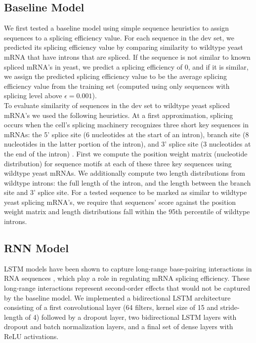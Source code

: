 \documentclass{article}
\begin{document}
\subsection{Baseline Model}
We first tested a baseline model using simple sequence heuristics to assign sequences to a splicing efficiency value. For each sequence in the dev set, we predicted its splicing efficiency value by comparing similarity to wildtype yeast mRNA that have introns that are spliced. If the sequence is not similar to known spliced mRNA's in yeast, we predict a splicing efficiency of 0, and if it is similar, we assign the predicted splicing efficiency value to be  the average splicing efficiency value from the training set (computed using only sequences with splicing level above $\epsilon = 0.001$). \newline \\
To evaluate similarity of sequences in the dev set to wildtype yeast spliced mRNA's we used the following heuristics. At a first approximation, splicing occurs when the cell's splicing machinery recognizes three short key sequences in mRNAs: the 5' splice site (6 nucleotides at the start of an intron), branch site (8 nucleotides in the latter portion of the intron), and 3' splice site (3 nucleotides at the end of the intron) \cite{splicingreview}. First we compute the position weight matrix (nucleotide distribution) for sequence motifs at each of these three key sequences using wildtype yeast mRNAs. We additionally compute two length distributions from wildtype introns: the full length of the intron, and the length between the branch site and 3' splice site. For a tested sequence to be marked as similar to wildtype yeast splicing mRNA's, we require that sequences' score against the position weight matrix and length distributions fall within the 95th percentile of wildtype introns.
\subsection{RNN Model}
LSTM models have been shown to capture long-range base-pairing interactions in RNA sequences \cite{rnn}, which play a role in regulating mRNA splicing efficiency. These long-range interactions represent second-order effects that would not be captured by the baseline model. We implemented a bidirectional LSTM architecture consisting of a first convolutional layer (64 filters, kernel size of 15 and stride-length of 4) followed by a dropout layer, two bidirectional LSTM layers with dropout and batch normalization layers, and a final set of dense layers with ReLU activations.
\end{document}
